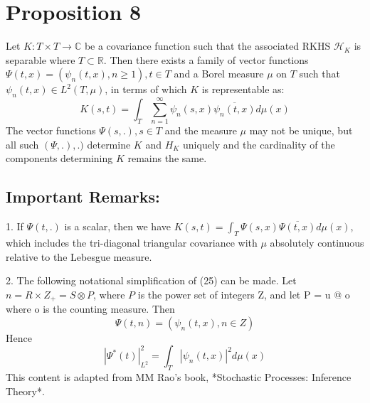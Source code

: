 \documentclass{article}
\begin{document}
\section*{Proposition 8}

Let $K : T \times T \to \mathbb{C}$ be a covariance function such that the
associated RKHS $\mathcal{H}_K$ is separable where $T \subset \mathbb{R}$.
Then there exists a family of vector functions $\Psi (t, x) = (\psi_n (t, x),
n \geq 1), t \in T$ and a Borel measure $\mu$ on $T$ such that $\psi_n (t, x)
\in L^2 (T, \mu)$, in terms of which $K$ is representable as:
\[ K (s, t) = \int_T \sum_{n = 1}^{\infty} \psi_n (s, x) \overline{\psi_n (t,
   x)} d \mu (x) \]
The vector functions $\Psi (s, .), s \in T$ and the measure $\mu$ may not be
unique, but all such $(\Psi, .), .)$ determine $K$ and $H_K$ uniquely and the
cardinality of the components determining $K$ remains the same.

\subsection*{Important Remarks:}

1. If $\Psi (t, .)$ is a scalar, then we have $K (s, t) = \int_T \Psi (s, x)
\overline{\Psi (t, x)} d \mu (x)$, which includes the tri-diagonal triangular
covariance with $\mu$ absolutely continuous relative to the Lebesgue measure.

2. The following notational simplification of (25) can be made. Let $n = R
\times Z_+ = S \otimes P$, where $P$ is the power set of integers Z, and let P
= u @ o where o is the counting measure. Then
\[ \Psi (t, n) = (\psi_n (t, x), n \in Z) \]
Hence
\[ | \Psi^{\ast} (t) |^2_{L^2} = \int_T | \psi_n (t, x) |^2 d \mu (x) \]
This content is adapted from MM Rao's book, *Stochastic Processes: Inference
Theory*.
\end{document}
